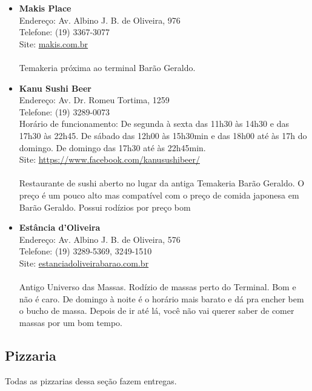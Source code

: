 \begin{itemize}
\item \textbf{Makis Place}
  \\Endereço: Av. Albino J. B. de Oliveira, 976
  \\Telefone: (19) 3367-3077
  \\Site: \url{makis.com.br}
  \\
  \\Temakeria próxima ao terminal Barão Geraldo.

\item \textbf{Kanu Sushi Beer}
  \\Endereço: Av. Dr. Romeu Tortima, 1259
  \\Telefone: (19) 3289-0073
  \\Horário de funcionamento: De segunda à sexta das 11h30 às 14h30
  e das 17h30 às 22h45.
  De sábado das 12h00 às 15h30min e das 18h00 até às 17h do domingo.
  De domingo das 17h30 até às 22h45min.
  \\Site: \url{https://www.facebook.com/kanusushibeer/}
  \\
  \\Restaurante de sushi aberto no lugar da antiga Temakeria Barão Geraldo.
  O preço é um pouco alto mas compatível com o preço de comida japonesa em
  Barão Geraldo. Possui rodízios por preço bom 

\item \textbf{Estância d'Oliveira}
  \\Endereço: Av. Albino J. B. de Oliveira, 576
  \\Telefone: (19) 3289-5369, 3249-1510
  \\Site: \url{estanciadoliveirabarao.com.br}
  \\
  \\Antigo Universo das Massas. Rodízio de massas perto do Terminal. Bom e não
  é caro. De domingo à noite é o horário mais barato e dá pra encher bem o
  bucho de massa. Depois de ir até lá, você não vai querer saber de comer
  massas por um bom tempo.
\end{itemize}

\subsection{Pizzaria}

Todas as pizzarias dessa seção fazem entregas.

